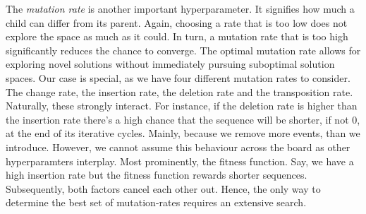 \documentclass[./../../paper.tex]{subfiles}
\begin{document}
The \emph{mutation rate} is another important hyperparameter. It signifies how much a child can differ from its parent. Again, choosing a rate that is too low does not explore the space as much as it could. In turn, a mutation rate that is too high significantly reduces the chance to converge. The optimal mutation rate allows for exploring novel solutions without immediately pursuing suboptimal solution spaces. Our case is special, as we have four different mutation rates to consider. The change rate, the insertion rate, the deletion rate and the transposition rate. Naturally, these strongly interact. For instance, if the deletion rate is higher than the insertion rate there's a high chance that the sequence will be shorter, if not 0, at the end of its iterative cycles. Mainly, because we remove more events, than we introduce. However, we cannot assume this behaviour across the board as other hyperparamters interplay. Most prominently, the fitness function. Say, we have a high insertion rate but the fitness function rewards shorter sequences. Subsequently, both factors cancel each other out. Hence, the only way to determine the best set of mutation-rates requires an extensive search.

\end{document}
